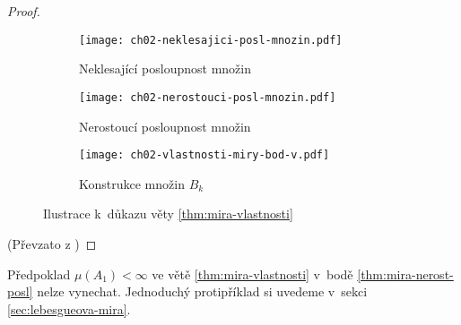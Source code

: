 \begin{proof}
\begin{figure}[h]
\begin{subfigure}{0.45\textwidth}
            \texttt{[image: ch02-neklesajici-posl-mnozin.pdf]}
            \caption{Neklesající posloupnost množin}
            \label{fig:nekl-posl-mnozin}
        \end{subfigure}
        \qquad
        \begin{subfigure}{0.45\textwidth}
            \texttt{[image: ch02-nerostouci-posl-mnozin.pdf]}
            \caption{Nerostoucí posloupnost množin}
            \label{fig:nerost-posl-mnozin}
        \end{subfigure}
        \begin{subfigure}{0.45\textwidth}
            \texttt{[image: ch02-vlastnosti-miry-bod-v.pdf]}
            \caption{Konstrukce množin $B_k$}
            \label{fig:vlastnosti-miry-bod-v}
        \end{subfigure}
        \caption{Ilustrace k~důkazu věty \ref{thm:mira-vlastnosti}}
    \end{figure}
    (Převzato z \citep[str. 19]{NetukaIntegral2016})
\end{proof}
\begin{remark}
    Předpoklad $\mu(A_1)<\infty$ ve větě \ref{thm:mira-vlastnosti} v~bodě \ref{thm:mira-nerost-posl} nelze vynechat. Jednoduchý protipříklad si uvedeme v~sekci \ref{sec:lebesgueova-mira}.
\end{remark}